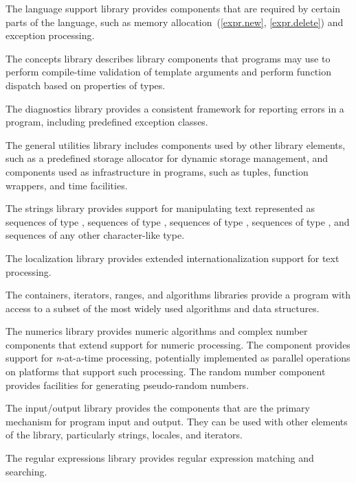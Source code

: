 \pnum
The language support library provides components that are
required by certain parts of the \Cpp{} language, such as memory allocation~(\ref{expr.new},
\ref{expr.delete}) and exception processing.

\pnum
The concepts library describes library components that \Cpp{}
programs may use to perform compile-time validation of template arguments and
perform function dispatch based on properties of types.

\pnum
The diagnostics library provides a consistent framework for
reporting errors in a \Cpp{} program, including predefined exception classes.

\pnum
The general utilities library includes components used
by other library elements, such as a predefined storage allocator for dynamic
storage management, and components used
as infrastructure
in \Cpp{} programs,
such as tuples, function wrappers, and time facilities.

\pnum
The strings library provides support for manipulating text represented
as sequences of type
,
sequences of type
,
sequences of type
,
sequences of type
,
and sequences of any other character-like type.

\pnum
The localization library provides extended internationalization
support for text processing.

\pnum
The containers, iterators, ranges,
and algorithms libraries provide a \Cpp{} program with access
to a subset of the most widely used algorithms and data structures.

\pnum
The numerics library provides
numeric algorithms and complex number components that extend support for numeric processing.
The
component provides support for
\textit{n}-at-a-time
processing,
potentially implemented as parallel operations on platforms that support such processing.
The random number component provides facilities for generating pseudo-random numbers.

\pnum
The input/output library provides the
components that are the primary mechanism for \Cpp{} program input and output.
They can be used with other elements of the library, particularly
strings, locales, and iterators.

\pnum
The regular expressions library provides regular expression matching and searching.


